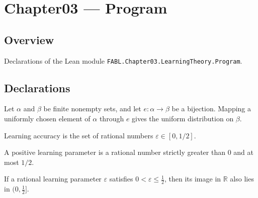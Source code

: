 \chapter{Chapter03 — Program}
\section{Overview}

Declarations of the Lean module \texttt{FABL.Chapter03.LearningTheory.Program}.

\section{Declarations}

\begin{theorem}
\label{FABL.map_uniformPMF_equiv}
\leanok
{}
Let $\alpha$ and $\beta$ be finite nonempty sets, and let $e:\alpha\to\beta$ be a
bijection. Mapping a uniformly chosen element of $\alpha$ through $e$ gives the uniform
distribution on $\beta$.
\end{theorem}

\begin{definition}
\label{FABL.LearningAccuracy}
\leanok
Learning accuracy is the set of rational numbers $\varepsilon\in[0,1/2]$.
\end{definition}

\begin{definition}
\label{FABL.PositiveLearningParameter}
\leanok
A positive learning parameter is a rational number strictly greater than $0$ and at most
$1/2$.
\end{definition}

\begin{theorem}
\label{FABL.positiveLearningParameter_toReal_mem_Ioc}
\leanok
{}
If a rational learning parameter $\varepsilon$ satisfies $0<\varepsilon\leq
\tfrac12$, then its image in $\mathbb R$ also lies in $(0,\tfrac12]$.
\end{theorem}

